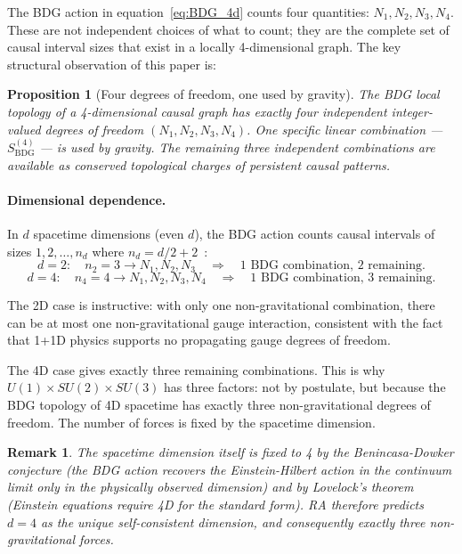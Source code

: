 \documentclass[11pt,a4paper]{article}
\newtheorem{proposition}[theorem]{Proposition}
\newtheorem{remark}[theorem]{Remark}
\newcommand{\SBDG}{S_{\mathrm{BDG}}}
\begin{document}
The BDG action in equation~\eqref{eq:BDG_4d} counts four quantities: $N_1, N_2,
N_3, N_4$. These are not independent choices of what to count; they are the
complete set of causal interval sizes that exist in a locally 4-dimensional
graph. The key structural observation of this paper is:

\begin{proposition}[Four degrees of freedom, one used by gravity]
\label{prop:dof}
The BDG local topology of a 4-dimensional causal graph has exactly four
independent integer-valued degrees of freedom $(N_1, N_2, N_3, N_4)$.
One specific linear combination --- $\SBDG^{(4)}$ --- is used by gravity.
The remaining three independent combinations are available as conserved
topological charges of persistent causal patterns.
\end{proposition}

\paragraph{Dimensional dependence.}
In $d$ spacetime dimensions (even $d$), the BDG action counts causal intervals
of sizes $1, 2, \ldots, n_d$ where $n_d = d/2 + 2$~\citep{Benincasa2010}:
\begin{equation}
  d = 2:\quad n_2 = 3 \to N_1, N_2, N_3
  \quad\Rightarrow\quad \text{1 BDG combination, 2 remaining.}
\end{equation}
\begin{equation}
  d = 4:\quad n_4 = 4 \to N_1, N_2, N_3, N_4
  \quad\Rightarrow\quad \text{1 BDG combination, 3 remaining.}
\end{equation}

The 2D case is instructive: with only one non-gravitational combination,
there can be at most one non-gravitational gauge interaction, consistent
with the fact that 1+1D physics supports no propagating gauge degrees of freedom.

The 4D case gives exactly three remaining combinations. This is why
$U(1) \times SU(2) \times SU(3)$ has three factors: not by postulate, but
because the BDG topology of 4D spacetime has exactly three non-gravitational
degrees of freedom. The number of forces is fixed by the spacetime dimension.

\begin{remark}
The spacetime dimension itself is fixed to 4 by the Benincasa-Dowker conjecture
(the BDG action recovers the Einstein-Hilbert action in the continuum limit
only in the physically observed dimension) and by Lovelock's theorem (Einstein
equations require 4D for the standard form). RA therefore predicts $d = 4$ as
the unique self-consistent dimension, and consequently exactly three
non-gravitational forces.
\end{remark}
\end{document}
